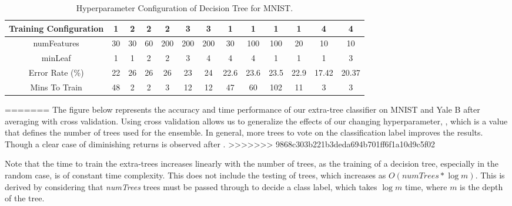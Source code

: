 \begin{table}[H]
  \centering
  \begin{tabular}{||c | c | c | c | c | c | c | c | c | c | c | c | c ||} 
    \hline
    Training Configuration & 1 & 2 & 2 & 2 & 3 & 3 & 1 & 1 & 1 & 1 & 4 & 4 \\
    \hline
    numFeatures & 30 & 30 & 60 & 200 & 200 & 200 & 30 & 100 & 100 &  20 & 10 & 10 \\
    \hline
    minLeaf & 1 & 1 & 2 & 2 & 3 & 4 & 4 & 4 & 1 & 1 & 1 & 3 \\
    \hline
    Error Rate (\%) & 22 & 26 & 26 & 26 & 23 & 24 & 22.6 & 23.6 & 23.5 & 22.9 & 17.42 & 20.37 \\
    \hline
    Mins To Train & 48 & 2 & 2 & 3 & 12 & 12 & 47 & 60 & 102 & 11 & 3 & 3 \\
    \hline
  \end{tabular}
  \caption{Hyperparameter Configuration of Decision Tree for MNIST.}
\end{table}
=======
The figure below represents the accuracy and time performance of our extra-tree classifier on MNIST and Yale B after averaging with cross validation. Using cross validation allows us to generalize the effects of our changing hyperparameter, , which is a value that defines the number of trees used for the ensemble. In general, more trees to vote on the classification label improves the results. Though a clear case of diminishing returns is observed after .
>>>>>>> 9868c303b221b3deda694b701ff6f1a10d9c5f02

Note that the time to train the extra-trees increases linearly with the number of trees, as the training of a decision tree, especially in the random case, is of constant time complexity. This does not include the testing of trees, which increases as $O(numTrees\ast \log m)$. This is derived by considering that \textit{numTrees} trees must be passed through to decide a class label, which takes $\log m$ time, where $m$ is the depth of the tree.

